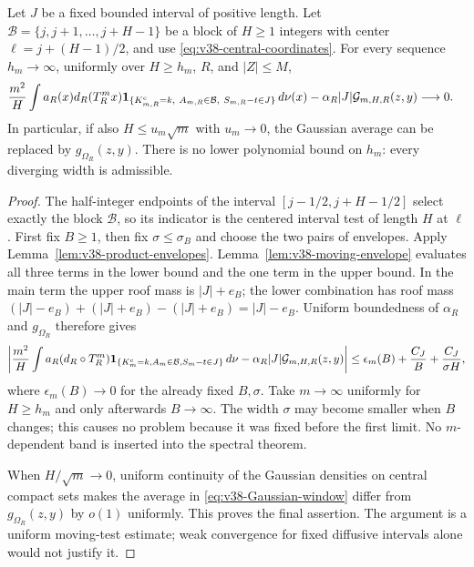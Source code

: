 \begin{theorem}
\label{thm:v38-occupation-mesoscopic}
Let $J$ be a fixed bounded interval of positive length. Let
$\mathcal B=\{j,j+1,\ldots,j+H-1\}$ be a block of $H\ge1$ integers
with center $\ell=j+(H-1)/2$, and use \eqref{eq:v38-central-coordinates}.
For every sequence $h_m\to\infty$, uniformly over $H\ge h_m$, $R$, and
$|Z|\le M$,
\begin{align}\label{eq:v38-occupation-mesoscopic}
 &\frac{m^2}{H}\int a_R(x)d_R(T_R^mx)
 \one_{\{K^{\rm c}_{m,R}=k,\ A_{m,R}\in\mathcal B,\ S_{m,R}-t\in J\}}
          \,d\nu(x)
 -\alpha_R|J|\mathcal G_{m,H,R}(z,y)\longrightarrow0.
\end{align}
In particular, if also $H\le u_m\sqrt m$ with $u_m\to0$, the Gaussian
average can be replaced by $g_{\Omega_R}(z,y)$. There is no lower
polynomial bound on $h_m$: every diverging width is admissible.
\end{theorem}
\begin{proof}
The half-integer endpoints of the interval
$[j-1/2,j+H-1/2]$ select exactly the block $\mathcal B$, so its
indicator is the centered interval test of length $H$ at $\ell$.
First fix $B\ge1$, then fix $\sigma\le\sigma_B$ and choose the two
pairs of envelopes. Apply Lemma~\ref{lem:v38-product-envelopes}.
Lemma~\ref{lem:v38-moving-envelope} evaluates all three terms in the
lower bound and the one term in the upper bound. In the main term the
upper roof mass is $|J|+e_B$; the lower combination has roof mass
$(|J|-e_B)+(|J|+e_B)-(|J|+e_B)=|J|-e_B$.
Uniform boundedness of $\alpha_R$ and $g_{\Omega_R}$ therefore gives
\begin{equation}\label{eq:v38-two-band-budget}
 \left|\frac{m^2}{H}\int a_R(d_R\circ T_R^m)
       \one_{\{K_m^{\rm c}=k,A_m\in\mathcal B,S_m-t\in J\}}\,d\nu
       -\alpha_R|J|\mathcal G_{m,H,R}(z,y)\right|
 \le \epsilon_m(B)+\frac{C_J}{B}+\frac{C_J}{\sigma H},
\end{equation}
where $\epsilon_m(B)\to0$ for the already fixed $B,\sigma$.
Take $m\to\infty$ uniformly for $H\ge h_m$ and only afterwards
$B\to\infty$. The width $\sigma$ may become smaller when $B$ changes;
this causes no problem because it was fixed before the first limit.
No $m$-dependent band is inserted into the spectral theorem.

When $H/\sqrt m\to0$, uniform continuity of the Gaussian densities
on central compact sets makes the average in
\eqref{eq:v38-Gaussian-window} differ from $g_{\Omega_R}(z,y)$ by
$o(1)$ uniformly. This proves the final assertion. The argument is a
uniform moving-test estimate; weak convergence for fixed diffusive
intervals alone would not justify it.
\end{proof}

